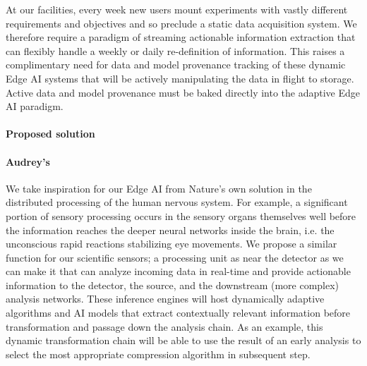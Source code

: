 \documentclass{article}
\begin{document}
At our facilities, every week new users mount experiments with vastly different requirements and objectives and so preclude a static data acquisition system. 
We therefore require a paradigm of streaming actionable information extraction that can flexibly handle a weekly or daily re-definition of information.
This raises a complimentary need for data and model provenance tracking of these dynamic Edge AI systems that will be actively manipulating the data in flight to storage.
Active data and model provenance must be baked directly into the adaptive Edge AI paradigm.


\paragraph{Proposed solution}

\paragraph{Audrey's}
We take inspiration for our Edge AI from Nature's own solution in the distributed processing of the human nervous system.
For example, a significant portion of sensory processing occurs in the sensory organs themselves well before the information reaches the deeper neural networks inside the brain, i.e. the unconscious rapid reactions stabilizing eye movements.
We propose a similar function for our scientific sensors; a processing unit as near the detector as we can make it that can analyze incoming data in real-time and provide actionable information to the detector, the source, and the downstream (more complex) analysis networks.
These inference engines will host dynamically adaptive algorithms and AI models that extract contextually relevant information before transformation and passage down the analysis chain.
As an example, this dynamic transformation chain will be able to use the result of an early analysis to select the most appropriate compression algorithm in subsequent step.
\end{document}
